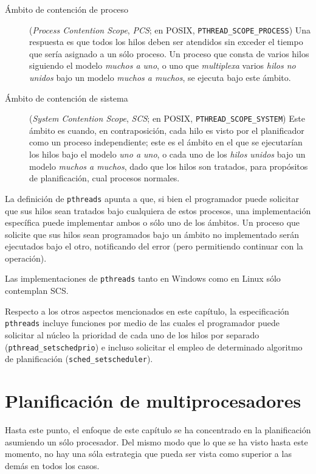 \documentclass[11pt,fleqn]{book} %
\begin{document}
\begin{description}
\item[Ámbito de contención de proceso] (\emph{Process Contention Scope},
     \emph{PCS}; en POSIX, \texttt{PTHREAD\_SCOPE\_PROCESS}) Una respuesta es que
     todos los hilos deben ser atendidos sin exceder el tiempo que
     sería asignado a un sólo proceso. Un proceso que consta de varios
     hilos siguiendo el modelo \emph{muchos a uno}, o uno que \emph{multiplexa}
     varios \emph{hilos no unidos} bajo un modelo \emph{muchos a muchos}, se
     ejecuta bajo este ámbito.
\item[Ámbito de contención de sistema] (\emph{System Contention Scope},
     \emph{SCS}; en POSIX, \texttt{PTHREAD\_SCOPE\_SYSTEM}) Este ámbito es cuando,
     en contraposición, cada hilo es visto por el planificador como un
     proceso independiente; este es el ámbito en el que se ejecutarían
     los hilos bajo el modelo \emph{uno a uno}, o cada uno de los \emph{hilos      unidos} bajo un modelo \emph{muchos a muchos}, dado que los hilos son
     tratados, para propósitos de planificación, cual procesos
     normales.
\end{description}

La definición de \texttt{pthreads} apunta a que, si bien el programador
puede solicitar que sus hilos sean tratados bajo cualquiera de estos
procesos, una implementación específica puede implementar ambos o
sólo uno de los ámbitos. Un proceso que solicite que sus hilos sean
programados bajo un ámbito no implementado serán ejecutados bajo el
otro, notificando del error (pero permitiendo continuar con la
operación).

Las implementaciones de \texttt{pthreads} tanto en Windows como en Linux
sólo contemplan SCS.

Respecto a los otros aspectos mencionados en este capítulo, la
especificación \texttt{pthreads} incluye funciones por medio de las cuales
el programador puede solicitar al núcleo la prioridad de cada uno de
los hilos por separado (\texttt{pthread\_setschedprio}) e incluso solicitar
el empleo de determinado algoritmo de planificación
(\texttt{sched\_setscheduler}).
\section{Planificación de multiprocesadores}
\label{sec-4-4}


Hasta este punto, el enfoque de este capítulo se ha concentrado en la
planificación asumiendo un sólo procesador. Del mismo modo que lo que
se ha visto hasta este momento, no hay una sóla estrategia que pueda
ser vista como superior a las demás en todos los casos.
\end{document}
